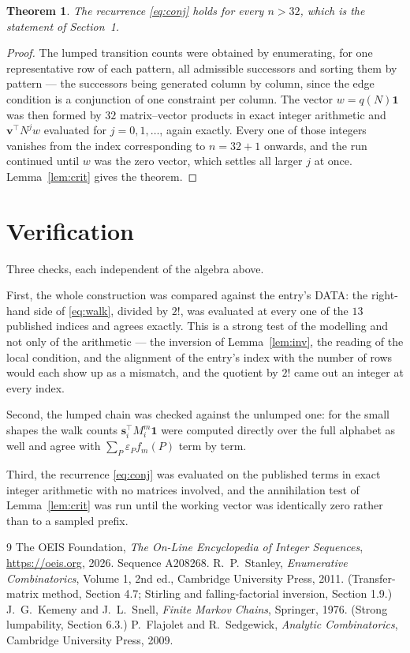 \documentclass[11pt,a4paper]{article}
\theoremstyle{plain}
\newtheorem{theorem}{Theorem}
\theoremstyle{definition}
\begin{document}
\begin{theorem}
The recurrence \eqref{eq:conj} holds for every $n>32$, which is the statement of
Section~1.
\end{theorem}

\begin{proof}
The lumped transition counts were obtained by enumerating, for one representative row of
each pattern, all admissible successors and sorting them by pattern --- the successors being
generated column by column, since the edge condition is a conjunction of one constraint per
column. The vector $w=q(N)\mathbf{1}$ was then formed by $32$ matrix--vector products
in exact integer arithmetic and $\mathbf{v}^{\!\top}N^{j}w$ evaluated for
$j=0,1,\dots$, again exactly. Every one of those integers vanishes from the index
corresponding to $n=32+1$ onwards, and the run continued until $w$ was the zero vector,
which settles all larger $j$ at once. Lemma~\ref{lem:crit} gives the theorem.
\end{proof}

\section{Verification}

Three checks, each independent of the algebra above.

First, the whole construction was compared against the entry's DATA: the right-hand side of
\eqref{eq:walk}, divided by $2!$, was evaluated at every one of the $13$
published indices and agrees exactly. This is a strong test of the modelling and not only of
the arithmetic --- the inversion of Lemma~\ref{lem:inv}, the reading of the local
condition, and the alignment of the entry's index with the number of rows would each
show up as a mismatch, and the quotient by $2!$ came out an integer at every index.

Second, the lumped chain was checked against the unlumped one: for the small shapes the walk
counts $\mathbf{s}_i^{\!\top}M_i^{m}\mathbf{1}$ were computed directly over the full
alphabet as well and agree with $\sum_P\varepsilon_Pf_m(P)$ term by term.

Third, the recurrence \eqref{eq:conj} was evaluated on the published terms in exact integer
arithmetic with no matrices involved, and the annihilation test of Lemma~\ref{lem:crit} was
run until the working vector was identically zero rather than to a sampled prefix.

\begin{thebibliography}{9}
 The OEIS Foundation, \emph{The On-Line Encyclopedia of Integer
Sequences}, \url{https://oeis.org}, 2026. Sequence A208268.
 R.~P.~Stanley, \emph{Enumerative Combinatorics}, Volume 1, 2nd ed.,
Cambridge University Press, 2011. (Transfer-matrix method, Section 4.7; Stirling and
falling-factorial inversion, Section 1.9.)
 J.~G.~Kemeny and J.~L.~Snell, \emph{Finite Markov Chains}, Springer,
1976. (Strong lumpability, Section 6.3.)
 P.~Flajolet and R.~Sedgewick, \emph{Analytic Combinatorics}, Cambridge
University Press, 2009.
\end{thebibliography}
\end{document}

